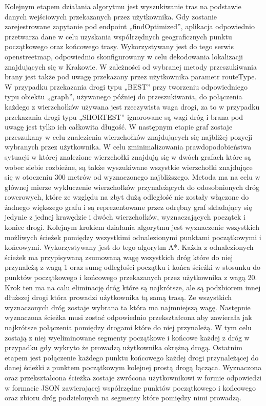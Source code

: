 Kolejnym etapem działania algorytmu jest wyszukiwanie tras na podstawie danych wejściowych przekazanych przez użytkownika. Gdy zostanie zarejestrowane zapytanie pod endpoint „findOptimized”, aplikacja odpowiednio przetwarza dane w celu uzyskania współrzędnych geograficznych punktu początkowego oraz końcowego trasy. Wykorzystywany jest do tego serwis openstreetmap, odpowiednio skonfigurowany w celu dekodowania lokalizacji znajdujących się w Krakowie. W zależności od wybranej metody przeszukiwania brany jest także pod uwagę przekazany przez użytkownika parametr routeType. W przypadku przekazania drogi typu „BEST” przy tworzeniu odpowiedniego typu obiektu „graph”, używanego później do przeszukiwania, do połączenia każdego z wierzchołków używana jest rzeczywista waga drogi, za to w przypadku przekazania drogi typu „SHORTEST” ignorowane są wagi dróg i brana pod uwagę jest tylko ich całkowita długość.\newline
W następnym etapie graf zostaje przeszukany w celu znalezienia wierzchołków znajdujących się najbliżej pozycji wybranych przez użytkownika. W celu zminimalizowania prawdopodobieństwa sytuacji w której znalezione wierzchołki znajdują się w dwóch grafach które są wobec siebie rozbieżne, są także wyszukiwane wszystkie wierzchołki znajdujące się w otoczeniu 300 metrów od wyznaczonego najbliższego. Metoda ma na celu w głównej mierze wykluczenie wierzchołków przynależących do odosobnionych dróg rowerowych, które ze względu na zbyt dużą odległość nie zostały włączone do żadnego większego grafu i są reprezentowane przez odrębny graf składający się jedynie z jednej krawędzie i dwóch wierzchołków, wyznaczających początek i koniec drogi.
Kolejnym krokiem działania algorytmu jest wyznaczenie wszystkich możliwych ścieżek pomiędzy wszystkimi odnalezionymi punktami początkowymi i końcowymi. Wykorzystywany jest do tego algorytm A*. Każda z odnalezionych ścieżek ma przypisywaną zsumowaną wagę wszystkich dróg które do niej przynależą z wagą 1 oraz sumę odległości początku i końca ścieżki w stosunku do punktów początkowego i końcowego przekazanych przez użytkownika z wagą 20. Krok ten ma na calu eliminację dróg które są najkrótsze, ale są podzbiorem innej dłuższej drogi która prowadzi użytkownika tą samą trasą. Ze wszystkich wyznaczonych dróg zostaje wybrana ta która ma najmniejszą wagę.
Następnie wyznaczona ścieżka musi zostać odpowiednio przekształcona aby zawierała jak najkrótsze połączenia pomiędzy drogami które do niej przynależą. W tym celu zostają z niej wyeliminowane segmenty początkowe i końcowe każdej z dróg w przypadku gdy wykryto że prowadzą użytkownika okrężną drogą. Ostatnim etapem jest połączenie każdego punktu końcowego każdej drogi przynależącej do danej ścieżki z punktem początkowym kolejnej prostą drogą łącząca. \newline
Wyznaczona oraz przekształcona ścieżka zostaje zwrócona użytkownikowi w formie odpowiedzi w formacie JSON zawierającej współrzędne punktów początkowego i końcowego oraz zbioru dróg podzielonych na segmenty które pomiędzy nimi prowadzą.

